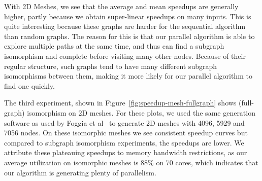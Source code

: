 %
%

With 2D Meshes, we see that the average and mean speedups are
generally higher, partly because we obtain super-linear
speedups on many inputs.
%
This is quite interesting because these graphs are harder for the
sequential algorithm~\cite{VF2} than random graphs.
%
The reason for this is that our parallel algorithm is able to explore
multiple paths at the same time, and thus can find a subgraph
isomorphism and complete before visiting many other nodes.
%
Because of their regular structure, such graphs tend to have many
different subgraph isomorphisms between them, making it more likely
for our parallel algorithm to find one quickly.




%



The third experiment, shown in Figure~\ref{fig:speedup-mesh-fullgraph}
shows (full-graph) isomorphism on 2D meshes.
%
For these plots, we used the same generation software as used by Foggia et al~\cite{argdatabase1} to
generate 2D meshes with 4096, 5929 and 7056 nodes.
%
On these isomorphic meshes we see consistent speedup curves but
compared to subgraph isomorphism experiments, the speedups are lower.
%
We attribute these plateauing speedups to memory bandwidth restrictions,
as our average utilization on isomorphic meshes is 88\% on 70 cores,
which indicates that our algorithm is generating plenty of parallelism.




